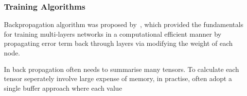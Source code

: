 \subsubsection{Training Algorithms}
Backpropagation algorithm was proposed by~\citet{werbos1975beyond}, which provided the fundamentals for training multi-layers networks in a computational efficient manner by propagating error term back through layers via modifying the weight of each node. 
\par
In back propagation often needs to summarise many tensors. To calculate each tensor seperately involve large expense of memory, in practise, often adopt a single buffer approach where each value